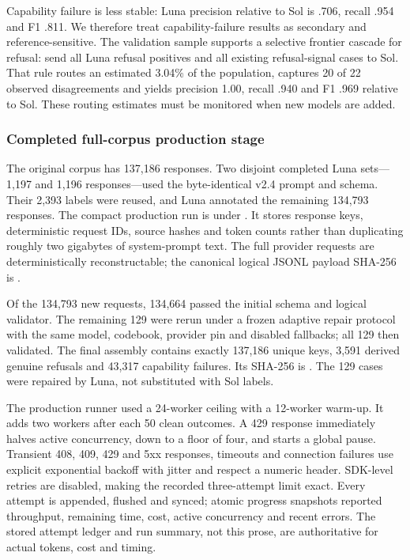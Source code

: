 Capability failure is less stable: Luna precision relative to Sol is .706,
recall .954 and F1 .811. We therefore treat capability-failure results as
secondary and reference-sensitive. The validation sample supports a selective
frontier cascade for refusal: send all Luna refusal positives and all existing
refusal-signal cases to Sol. That rule routes an estimated 3.04\% of the
population, captures 20 of 22 observed disagreements and yields precision 1.00,
recall .940 and F1 .969 relative to Sol. These routing estimates must be
monitored when new models are added.

\subsubsection{Completed full-corpus production stage}

The original corpus has 137,186 responses. Two disjoint completed Luna sets---
1,197 and 1,196 responses---used the byte-identical v2.4 prompt and schema.
Their 2,393 labels were reused, and Luna annotated the remaining 134,793
responses. The compact production run is under
.
It stores response keys, deterministic request IDs, source hashes and token
counts rather than duplicating roughly two gigabytes of system-prompt text.
The full provider requests are deterministically reconstructable; the
canonical logical JSONL payload SHA-256 is
.

Of the 134,793 new requests, 134,664 passed the initial schema and logical
validator. The remaining 129 were rerun under a frozen adaptive repair protocol
with the same model, codebook, provider pin and disabled fallbacks; all 129 then
validated. The final assembly contains exactly 137,186 unique keys, 3,591
derived genuine refusals and 43,317 capability failures. Its SHA-256 is
.
The 129 cases were repaired by Luna, not substituted with Sol labels.

The production runner used a 24-worker ceiling with a 12-worker warm-up. It
adds two workers after each 50 clean outcomes. A 429 response immediately
halves active concurrency, down to a floor of four, and starts a global pause.
Transient 408, 409, 429 and 5xx responses, timeouts and connection failures use
explicit exponential backoff with jitter and respect a numeric
 header. SDK-level retries are disabled, making the recorded
three-attempt limit exact. Every attempt is appended, flushed and synced;
atomic progress snapshots reported throughput, remaining time, cost, active
concurrency and recent errors. The stored attempt ledger and run summary, not
this prose, are authoritative for actual tokens, cost and timing.

